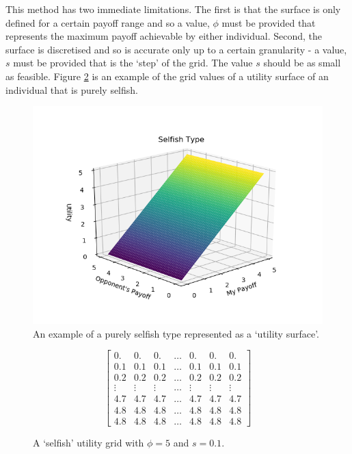 \documentclass[11pt]{book}
\newcommand*{\np}{\par\noindent\newline}
\begin{document}
\np This method has two immediate limitations. 
The first is that the surface is only defined for a certain payoff range and so a value, $\phi$ must be provided that represents the maximum payoff achievable by either individual.
Second, the surface is discretised and so is accurate only up to a certain granularity - a value, $s$ must be provided that is the `step' of the grid.
The value $s$ should be as small as feasible. 
Figure \ref{selfishUtilityGrid} is an example of the grid values of a utility surface of an individual that is purely selfish.

\begin{figure}
	\centering
	\includegraphics[scale=0.75]{resources/selfish.png}
	\caption{An example of a purely selfish type represented as a `utility surface'.}
	\label{selfishUtilitySurface}
\end{figure}

\begin{figure}
\[
	\begin{bmatrix} 
	0. & 0. & 0. & \dots & 0. & 0. & 0.\\
	0.1 & 0.1 & 0.1 & \dots & 0.1 & 0.1 & 0.1\\
	0.2 & 0.2 & 0.2 & \dots & 0.2 & 0.2 & 0.2\\
	\vdots & \vdots & \vdots & \dots & \vdots &\vdots &\vdots\\
	4.7 & 4.7 & 4.7 & \dots & 4.7 & 4.7 & 4.7\\
	4.8 & 4.8 & 4.8 & \dots & 4.8 & 4.8 & 4.8\\
	4.8 & 4.8 & 4.8 & \dots & 4.8 & 4.8 & 4.8 
	\end{bmatrix}
\]
\caption{A `selfish' utility grid with $\phi = 5$ and $s = 0.1$.}
\label{selfishUtilityGrid}
\end{figure}
\end{document}

